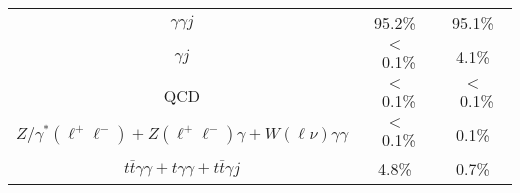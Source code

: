 \begin{tabular}{|c|c|c|}
\hline
$\gamma\gamma j$                      & 95.2\%  &  95.1\%   \\
$\gamma j$                            & $<$~0.1\% &  4.1\%  \\
QCD                                   & $<$~0.1\% &  $<$~0.1\% \\
$Z/\gamma^*(\ell^+\ell^-) + Z(\ell^+\ell^-)\gamma + W(\ell\nu)\gamma\gamma$ & $<$~0.1\% & 0.1\% \\
$t\bar{t}\gamma\gamma + t\gamma\gamma + t\bar{t}\gamma j$ & 4.8\% &  0.7\% \\
\hline
\end{tabular}
